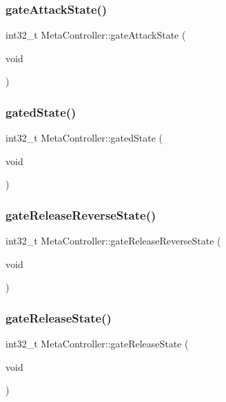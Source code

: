 \subsubsection{\texorpdfstring{gate\+Attack\+State()}{gateAttackState()}}
{\footnotesize\ttfamily int32\+\_\+t Meta\+Controller\+::gate\+Attack\+State (\begin{DoxyParamCaption}\item[{void}]{ }\end{DoxyParamCaption})}

\mbox{\label{class_meta_controller_a7381643e084577e6c5dc2a49b37ffa3a}} 
\subsubsection{\texorpdfstring{gated\+State()}{gatedState()}}
{\footnotesize\ttfamily int32\+\_\+t Meta\+Controller\+::gated\+State (\begin{DoxyParamCaption}\item[{void}]{ }\end{DoxyParamCaption})}

\mbox{\label{class_meta_controller_aee60552d4bbf1fd4087daa09419d57b0}} 
\subsubsection{\texorpdfstring{gate\+Release\+Reverse\+State()}{gateReleaseReverseState()}}
{\footnotesize\ttfamily int32\+\_\+t Meta\+Controller\+::gate\+Release\+Reverse\+State (\begin{DoxyParamCaption}\item[{void}]{ }\end{DoxyParamCaption})}

\mbox{\label{class_meta_controller_af8205394c094350baa9f9f7fdd2fe29c}} 
\subsubsection{\texorpdfstring{gate\+Release\+State()}{gateReleaseState()}}
{\footnotesize\ttfamily int32\+\_\+t Meta\+Controller\+::gate\+Release\+State (\begin{DoxyParamCaption}\item[{void}]{ }\end{DoxyParamCaption})}

